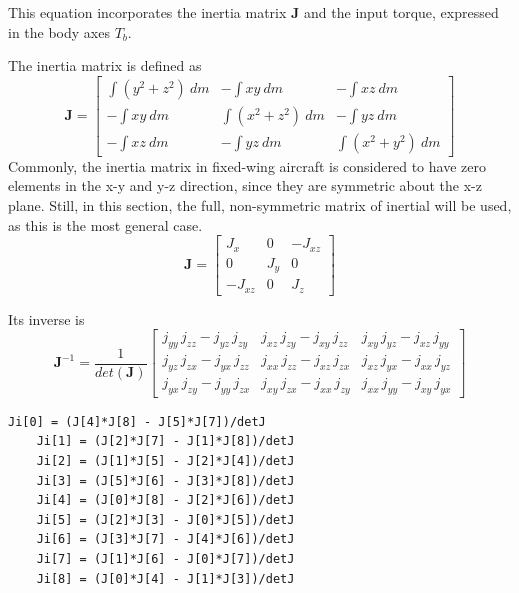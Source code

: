 This equation incorporates the inertia matrix $\bm{J}$ and the input torque, expressed in the body axes $T_b$.

The inertia matrix is defined as
\begin{equation}
	\bm{J} =
	\begin{bmatrix}
		\int(y^2 + z^2)~dm & -\int xy~dm        & -\int xz~dm        \\
		-\int xy~dm        & \int(x^2 + z^2)~dm & -\int yz~dm        \\
		-\int xz~dm        & -\int yz~dm        & \int(x^2 + y^2)~dm
	\end{bmatrix}
\end{equation}
Commonly, the inertia matrix in fixed-wing aircraft is considered to have zero elements in the x-y and y-z direction, since they are symmetric about the x-z plane.
Still, in this section, the full, non-symmetric matrix of inertial will be used, as this is the most general case.
\begin{equation}\label{eq:inertiaMat}
	\bm{J} = 
	\begin{bmatrix}
		J_x     & 0   & -J_{xz} \\
		0       & J_y & 0       \\
		-J_{xz} & 0   & J_z
	\end{bmatrix}
\end{equation}

Its inverse is
\begin{equation}
	\bm{J}^{-1} = \frac{1}{det(\bm{J})}
	\begin{bmatrix}
		{j}_{yy}\, {j}_{zz} - {j}_{yz}\, {j}_{zy} & {j}_{xz}\, {j}_{zy} - {j}_{xy}\, {j}_{zz} & {j}_{xy}\, {j}_{yz} - {j}_{xz}\, {j}_{yy}\\
		{j}_{yz}\, {j}_{zx} - {j}_{yx}\, {j}_{zz} & {j}_{xx}\, {j}_{zz} - {j}_{xz}\, {j}_{zx} & {j}_{xz}\, {j}_{yx} - {j}_{xx}\, {j}_{yz}\\
		{j}_{yx}\, {j}_{zy} - {j}_{yy}\, {j}_{zx} & {j}_{xy}\, {j}_{zx} - {j}_{xx}\, {j}_{zy} & {j}_{xx}\, {j}_{yy} - {j}_{xy}\, {j}_{yx}
	\end{bmatrix}
\end{equation}
\begin{lstlisting}[style=C-style]
	Ji[0] = (J[4]*J[8] - J[5]*J[7])/detJ
	Ji[1] = (J[2]*J[7] - J[1]*J[8])/detJ
	Ji[2] = (J[1]*J[5] - J[2]*J[4])/detJ
	Ji[3] = (J[5]*J[6] - J[3]*J[8])/detJ
	Ji[4] = (J[0]*J[8] - J[2]*J[6])/detJ
	Ji[5] = (J[2]*J[3] - J[0]*J[5])/detJ
	Ji[6] = (J[3]*J[7] - J[4]*J[6])/detJ
	Ji[7] = (J[1]*J[6] - J[0]*J[7])/detJ
	Ji[8] = (J[0]*J[4] - J[1]*J[3])/detJ
\end{lstlisting}


